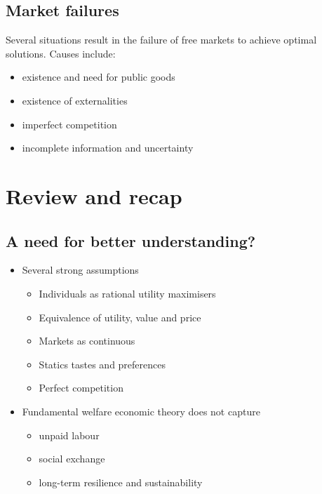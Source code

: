 \subsection{Market failures}
Several situations result in the failure of free markets to achieve optimal solutions. Causes include:
\begin{itemize}
  \item existence and need for public goods
  \item existence of externalities
  \item imperfect competition
  \item incomplete information and uncertainty
\end{itemize}
\section{Review and recap}
\subsection{A need for better understanding?}
\begin{itemize}
  \item Several strong assumptions
        \begin{itemize}
          \item Individuals as rational utility maximisers
          \item Equivalence of utility, value and price
          \item Markets as continuous
          \item Statics tastes and preferences
          \item Perfect competition
        \end{itemize}
  \item Fundamental welfare economic theory does not capture
        \begin{itemize}
          \item unpaid labour
          \item social exchange
          \item long-term resilience and sustainability
        \end{itemize}
\end{itemize}